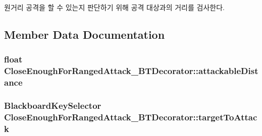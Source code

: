 원거리 공격을 할 수 있는지 판단하기 위해 공격 대상과의 거리를 검사한다. 

\subsection{Member Data Documentation}
\subsubsection[{\texorpdfstring{attackable\+Distance}{attackableDistance}}]{\setlength{\rightskip}{0pt plus 5cm}float Close\+Enough\+For\+Ranged\+Attack\+\_\+\+B\+T\+Decorator\+::attackable\+Distance}\hypertarget{class_close_enough_for_ranged_attack___b_t_decorator_a28155d62ff5f45740dad3dfec7254e5e}{}\label{class_close_enough_for_ranged_attack___b_t_decorator_a28155d62ff5f45740dad3dfec7254e5e}
\subsubsection[{\texorpdfstring{target\+To\+Attack}{targetToAttack}}]{\setlength{\rightskip}{0pt plus 5cm}Blackboard\+Key\+Selector Close\+Enough\+For\+Ranged\+Attack\+\_\+\+B\+T\+Decorator\+::target\+To\+Attack}\hypertarget{class_close_enough_for_ranged_attack___b_t_decorator_a830126ebaba4083a84ea549114ef39d7}{}\label{class_close_enough_for_ranged_attack___b_t_decorator_a830126ebaba4083a84ea549114ef39d7}
